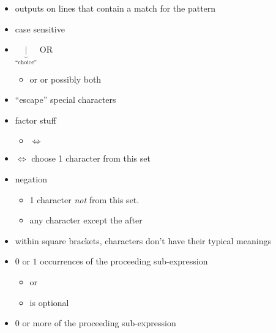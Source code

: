 \begin{itemize}
    \item outputs on  lines that contain a match for the pattern
    \item case sensitive
    \item $ \underbrace{|}_{\text{``choice''}} $ \textrightarrow{} OR
          \begin{itemize}
              \item {} \textrightarrow{}
                     or  or possibly both
          \end{itemize}
    \item \code{\textbackslash} \textrightarrow{} ``escape'' special characters
    \item factor stuff
          \begin{itemize}
              \item {} $ \iff $ 
          \end{itemize}
    \item {} $ \iff $  \textrightarrow{} choose
          1 character from this set
    \item \code{\textasciicircum} \textrightarrow{} negation
          \begin{itemize}
              \item {} \textrightarrow{}
                    1 character \emph{not} from this set.
              \item {} \textrightarrow{} any character
                    except the  after 
          \end{itemize}
    \item within square brackets, characters don't have their typical
          meanings
    \item {} \textrightarrow{} $ 0 $ or $ 1 $ occurrences of the
          proceeding sub-expression
          \begin{itemize}
              \item {} \textrightarrow{}  or 
              \item {} \textrightarrow{}  is optional
          \end{itemize}
    \item \code{*} \textrightarrow{} 0 or more of the proceeding sub-expression
          \begin{itemize}

\end{itemize}
\end{itemize}
